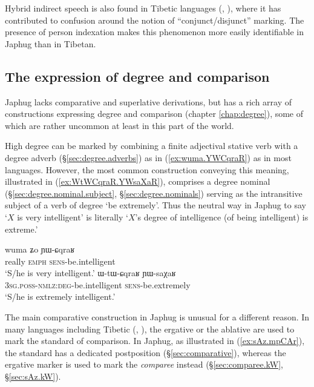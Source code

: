 Hybrid indirect speech is also found in  Tibetic languages (\citealt{tournadre08conjunct}, \citealt[327]{tournadre21tibetic}), where it has contributed to confusion around the notion of ``conjunct/disjunct'' marking. The presence of person indexation makes this phenomenon more easily identifiable in Japhug than in Tibetan.
 
\subsection{The expression of degree and comparison}
Japhug lacks comparative and superlative derivations, but has a rich array of constructions  expressing degree and comparison (chapter \ref{chap:degree}), some of which are rather uncommon at least in this part of the world.

High degree can be marked by combining a finite adjectival stative verb with a degree adverb (§\ref{sec:degree.adverbs}) as in (\ref{ex:wuma.YWCqraR}) as in most languages. However, the most common construction conveying this meaning, illustrated in (\ref{ex:WtWCqraR.YWsaXaR}), comprises a degree nominal (§\ref{sec:degree.nominal.subject}, §\ref{sec:degree.nominals}) serving as the intransitive subject of a verb of degree `be extremely'. Thus the neutral way in Japhug to say `$X$ is very intelligent' is literally `$X$'s degree of intelligence (of being intelligent) is extreme.'

\begin{exe} 
\ex 
\begin{xlist}
\ex \label{ex:wuma.YWCqraR}
\gll wuma ʑo ɲɯ-ɕqraʁ \\
really \textsc{emph} \textsc{sens}-be.intelligent \\
\glt `S/he is very intelligent.' 
\ex \label{ex:WtWCqraR.YWsaXaR}
\gll ɯ-tɯ-ɕqraʁ ɲɯ-saχaʁ \\
\textsc{3sg}.\textsc{poss}-\textsc{nmlz}:\textsc{deg}-be.intelligent \textsc{sens}-be.extremely \\
\glt `S/he is extremely intelligent.'  
\end{xlist}
\end{exe} 

The main comparative construction in Japhug is unusual for a different reason. In many languages including Tibetic (\citealt[239]{vbrugmo03maqu}, \citealt[29]{heine-kuteva02}), the ergative or the  ablative are used to mark the standard of comparison. In Japhug, as illustrated in (\ref{ex:sAz.mpCAr}), the standard has a dedicated postposition (§\ref{sec:comparative}), whereas the ergative marker  is used to mark the \textit{comparee} instead (§\ref{sec:comparee.kW}, §\ref{sec:sAz.kW}). 



